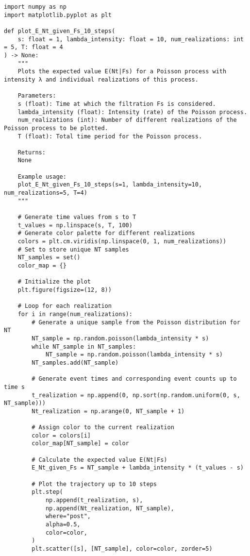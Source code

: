 \documentclass[12pt,letterpaper]{article}
\theoremstyle{definition}
\begin{document}
\begin{lstlisting}
import numpy as np
import matplotlib.pyplot as plt

def plot_E_Nt_given_Fs_10_steps(
    s: float = 1, lambda_intensity: float = 10, num_realizations: int = 5, T: float = 4
) -> None:
    """
    Plots the expected value E(Nt|Fs) for a Poisson process with intensity λ and individual realizations of this process.

    Parameters:
    s (float): Time at which the filtration Fs is considered.
    lambda_intensity (float): Intensity (rate) of the Poisson process.
    num_realizations (int): Number of different realizations of the Poisson process to be plotted.
    T (float): Total time period for the Poisson process.

    Returns:
    None

    Example usage:
    plot_E_Nt_given_Fs_10_steps(s=1, lambda_intensity=10, num_realizations=5, T=4)
    """

    # Generate time values from s to T
    t_values = np.linspace(s, T, 100)
    # Generate color palette for different realizations
    colors = plt.cm.viridis(np.linspace(0, 1, num_realizations))
    # Set to store unique NT samples
    NT_samples = set()
    color_map = {}

    # Initialize the plot
    plt.figure(figsize=(12, 8))

    # Loop for each realization
    for i in range(num_realizations):
        # Generate a unique sample from the Poisson distribution for NT
        NT_sample = np.random.poisson(lambda_intensity * s)
        while NT_sample in NT_samples:
            NT_sample = np.random.poisson(lambda_intensity * s)
        NT_samples.add(NT_sample)

        # Generate event times and corresponding event counts up to time s
        t_realization = np.append(0, np.sort(np.random.uniform(0, s, NT_sample)))
        Nt_realization = np.arange(0, NT_sample + 1)

        # Assign color to the current realization
        color = colors[i]
        color_map[NT_sample] = color

        # Calculate the expected value E(Nt|Fs)
        E_Nt_given_Fs = NT_sample + lambda_intensity * (t_values - s)

        # Plot the trajectory up to 10 steps
        plt.step(
            np.append(t_realization, s),
            np.append(Nt_realization, NT_sample),
            where="post",
            alpha=0.5,
            color=color,
        )
        plt.scatter([s], [NT_sample], color=color, zorder=5)


\end{lstlisting}
\end{document}
